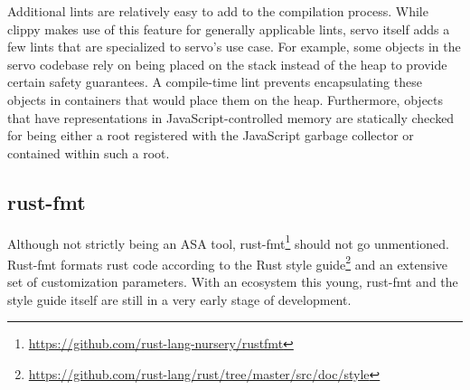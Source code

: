 \documentclass{scrartcl}
\begin{document}
Additional lints are relatively easy to add to the compilation process. While clippy makes use of this feature for generally applicable lints, servo itself adds a few lints that are specialized to servo's use case. For example, some objects in the servo codebase rely on being placed on the stack instead of the heap to provide certain safety guarantees. A compile-time lint prevents encapsulating these objects in containers that would place them on the heap. Furthermore, objects that have representations in JavaScript-controlled memory are statically checked for being either a root registered with the JavaScript garbage collector or contained within such a root.


\subsection{rust-fmt}

Although not strictly being an ASA tool, rust-fmt\footnote{\url{https://github.com/rust-lang-nursery/rustfmt}} should not go unmentioned. Rust-fmt formats rust code according to the Rust style guide\footnote{\url{https://github.com/rust-lang/rust/tree/master/src/doc/style}} and an extensive set of customization parameters. With an ecosystem this young, rust-fmt and the style guide itself are still in a very early stage of development.
\end{document}
